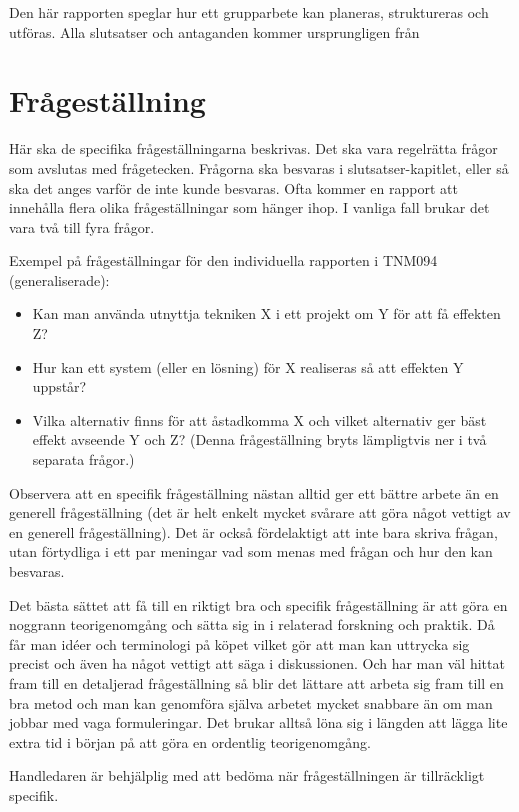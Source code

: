 \documentclass[a4paper,12pt,oneside,final]{extbook}
\begin{document}
Den här rapporten speglar hur ett grupparbete kan planeras, struktureras och utföras. Alla slutsatser och antaganden kommer ursprungligen från 

\section{Frågeställning}

Här ska de specifika frågeställningarna beskrivas. Det ska vara
regelrätta frågor som avslutas med frågetecken. Frågorna ska besvaras
i slutsatser-kapitlet, eller så ska det anges varför de inte kunde
besvaras. Ofta kommer en rapport att innehålla flera olika
frågeställningar som hänger ihop. I vanliga fall brukar det vara två
till fyra frågor.

Exempel på frågeställningar för den individuella rapporten i TNM094
(generaliserade):

\begin{itemize}
\item Kan man använda utnyttja tekniken X i ett projekt om Y för att
  få effekten Z?
\item Hur kan ett system (eller en lösning) för X realiseras så att
  effekten Y uppstår?
\item Vilka alternativ finns för att åstadkomma X och vilket
  alternativ ger bäst effekt avseende Y och Z?  (Denna frågeställning
  bryts lämpligtvis ner i två separata frågor.)
\end{itemize}

Observera att en specifik frågeställning nästan alltid ger ett bättre
arbete än en generell frågeställning (det är helt enkelt mycket
svårare att göra något vettigt av en generell frågeställning). Det är
också fördelaktigt att inte bara skriva frågan, utan förtydliga i ett
par meningar vad som menas med frågan och hur den kan besvaras.

Det bästa sättet att få till en riktigt bra och specifik
frågeställning är att göra en noggrann teorigenomgång och sätta sig in
i relaterad forskning och praktik. Då får man idéer och terminologi på
köpet vilket gör att man kan uttrycka sig precist och även ha något
vettigt att säga i diskussionen. Och har man väl hittat fram till en
detaljerad frågeställning så blir det lättare att arbeta sig fram till
en bra metod och man kan genomföra själva arbetet mycket snabbare än
om man jobbar med vaga formuleringar. Det brukar alltså löna sig i
längden att lägga lite extra tid i början på att göra en ordentlig
teorigenomgång.

Handledaren är behjälplig med att bedöma när frågeställningen är
tillräckligt specifik.
\end{document}
